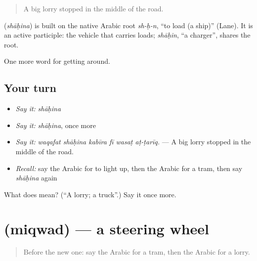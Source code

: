 \begin{quote}
A big lorry stopped in the middle of the road.
\end{quote}

\begin{cousinweb}
\textbf{} (\emph{shāḥina}) is built on the native Arabic root \emph{sh-ḥ-n}, \textquotedblleft{}to load (a ship)\textquotedblright{} (Lane). It is an active participle: the vehicle that carries loads; \emph{shāḥin}, \textquotedblleft{}a charger\textquotedblright{}, shares the root.
\end{cousinweb}

\begin{grammarlens}[title={What you've built}]
One more word for getting around.
\end{grammarlens}

\subsection*{Your turn}
\begin{itemize}
\raggedright
  \item \emph{Say it:} \emph{shāḥina}
  \item \emph{Say it:} \emph{shāḥina}, once more
  \item \emph{Say it:} \emph{waqafat shāḥina kabīra fī wasaṭ aṭ-ṭarīq.} — A big lorry stopped in the middle of the road.
  \item \emph{Recall:} say the Arabic for to light up, then the Arabic for a tram, then say \emph{shāḥina} again
\end{itemize}

\begin{tcolorbox}[breakable,colback=teal!4,colframe=teal!35!black,title={Before you move on}]
What does  mean? (\textquotedblleft{}A lorry; a truck\textquotedblright{}.) Say it once more.
\end{tcolorbox}
\section[\texorpdfstring{\ar{مقود} (miqwad)}{مقود (miqwad)}]{ (miqwad) — a steering wheel}

\label{lesson:AR-C445-miqwad}



\begin{quote}
Before the new one: say the Arabic for a tram, then the Arabic for a lorry.
\end{quote}

